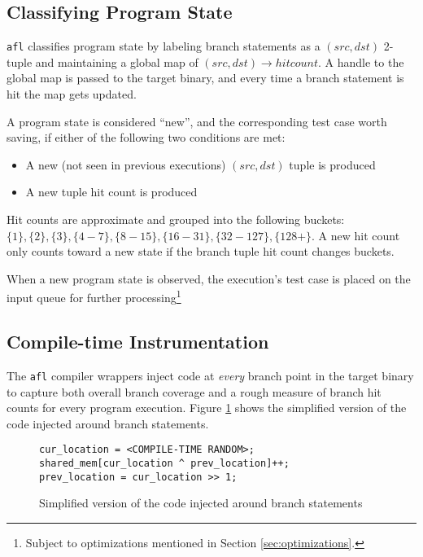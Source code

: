 \subsection{Classifying Program State}

\texttt{afl} classifies program state by labeling branch statements
as a $(src, dst)$ 2-tuple and maintaining a global map of
$(src, dst) \rightarrow hitcount$. A handle to the global map is passed
to the target binary, and every time a branch statement is hit the map
gets updated.

A program state is considered ``new'', and the corresponding test case
worth saving, if either of the following two conditions are met:
\begin{itemize}
    \item A new (not seen in previous executions) $(src, dst)$ tuple is produced
    \item A new tuple hit count is produced
\end{itemize}

Hit counts are approximate and grouped into the following buckets\cite{afl-whitepaper}: $\{1\}, \{2\}, \{3\}, \{4-7\}, \{8-15\}, \{16-31\}, \{32-127\}, \{128+\}$. A new hit count only counts toward a new state if the branch tuple
hit count changes buckets.

When a new program state is observed, the execution's test case is placed
on the input queue for further processing\footnote{Subject to optimizations mentioned in Section \ref{sec:optimizations}.}

\subsection{Compile-time Instrumentation}

The \texttt{afl} compiler wrappers inject code at \textit{every} branch point
in the target
binary to capture both overall branch coverage and a rough measure of branch 
hit counts for every program execution.
Figure \ref{fig:injection} shows the simplified version of the code
injected around branch statements\cite{afl-whitepaper}. \\

\begin{figure}[H]
    \begin{lstlisting}[language={[ANSI]C}]
cur_location = <COMPILE-TIME RANDOM>;
shared_mem[cur_location ^ prev_location]++;
prev_location = cur_location >> 1;
\end{lstlisting}
\caption{Simplified version of the code injected around branch statements}
\label{fig:injection}
\end{figure}

